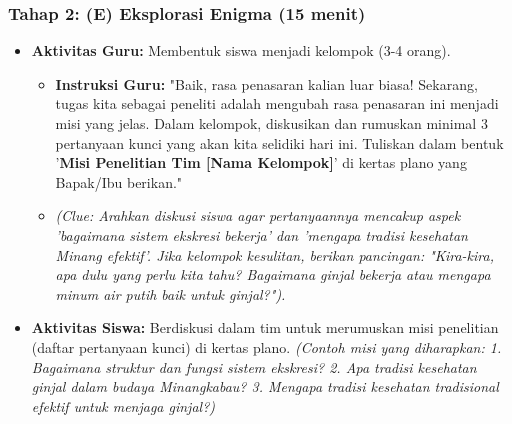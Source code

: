 \documentclass[a4paper,12pt]{article}
\begin{document}
\subsubsection{Tahap 2: (E) Eksplorasi Enigma (15 menit)}
\begin{itemize}
\item \textbf{Aktivitas Guru:} Membentuk siswa menjadi kelompok (3-4 orang).
    \begin{itemize}
    \item \textbf{Instruksi Guru:} "Baik, rasa penasaran kalian luar biasa! Sekarang, tugas kita sebagai peneliti adalah mengubah rasa penasaran ini menjadi misi yang jelas. Dalam kelompok, diskusikan dan rumuskan minimal 3 pertanyaan kunci yang akan kita selidiki hari ini. Tuliskan dalam bentuk '\textbf{Misi Penelitian Tim [Nama Kelompok]}' di kertas plano yang Bapak/Ibu berikan."
    \item \textit{(Clue: Arahkan diskusi siswa agar pertanyaannya mencakup aspek 'bagaimana sistem ekskresi bekerja' dan 'mengapa tradisi kesehatan Minang efektif'. Jika kelompok kesulitan, berikan pancingan: "Kira-kira, apa dulu yang perlu kita tahu? Bagaimana ginjal bekerja atau mengapa minum air putih baik untuk ginjal?").}
    \end{itemize}
\item \textbf{Aktivitas Siswa:} Berdiskusi dalam tim untuk merumuskan misi penelitian (daftar pertanyaan kunci) di kertas plano. \textit{(Contoh misi yang diharapkan: 1. Bagaimana struktur dan fungsi sistem ekskresi? 2. Apa tradisi kesehatan ginjal dalam budaya Minangkabau? 3. Mengapa tradisi kesehatan tradisional efektif untuk menjaga ginjal?)}
\end{itemize}
\end{document}
